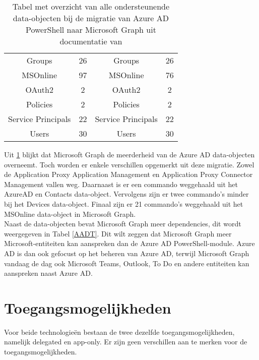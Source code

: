 \begin{table}
\begin{tabular}{ |c|c||c|c| }
        Groups & 26 & Groups & 26 \\ 
        MSOnline & 97 & MSOnline & 76 \\
        OAuth2 & 2 & OAuth2 & 2 \\ 
        Policies & 2 & Policies & 2 \\ 
        Service Principals & 22 & Service Principals & 22 \\ 
        Users & 30 & Users & 30 \\ 
        \hline
    \end{tabular}
    \caption[Tabel migratie Azure AD data-objecten naar Microsoft Graph]{Tabel met overzicht van alle ondersteunende data-objecten bij de migratie van Azure \ac{AD} PowerShell naar Microsoft Graph uit documentatie van \textcite{Microsoft2023l}}
    \label{AADMSG}
\end{table}

Uit \ref{AADMSG} blijkt dat Microsoft Graph de meerderheid van de Azure \ac{AD} data-objecten overneemt. Toch worden er enkele verschillen opgemerkt uit deze migratie. Zowel de Application Proxy Application Management en Application Proxy Connector Management vallen weg. Daarnaast is er een commando weggehaald uit het AzureAD en Contacts data-object. Vervolgens zijn er twee commando's minder bij het Devices data-object. Finaal zijn er 21 commando's weggehaald uit het MSOnline data-object in Microsoft Graph. \\

Naast de data-objecten bevat Microsoft Graph meer dependencies, dit wordt weergegeven in Tabel \ref{AADT}. Dit wilt zeggen dat Microsoft Graph meer Microsoft-entiteiten kan aanspreken dan de Azure \ac{AD} PowerShell-module. Azure \ac{AD} is dan ook gefocust op het beheren van Azure \ac{AD}, terwijl Microsoft Graph vandaag de dag ook Microsoft Teams, Outlook, To Do en andere entiteiten kan aanspreken naast Azure \ac{AD}. 


\section{Toegangsmogelijkheden}



Voor beide technologieën bestaan de twee dezelfde toegangsmogelijkheden, namelijk delegated en app-only. Er zijn geen verschillen aan te merken voor de toegangsmogelijkheden. \\

